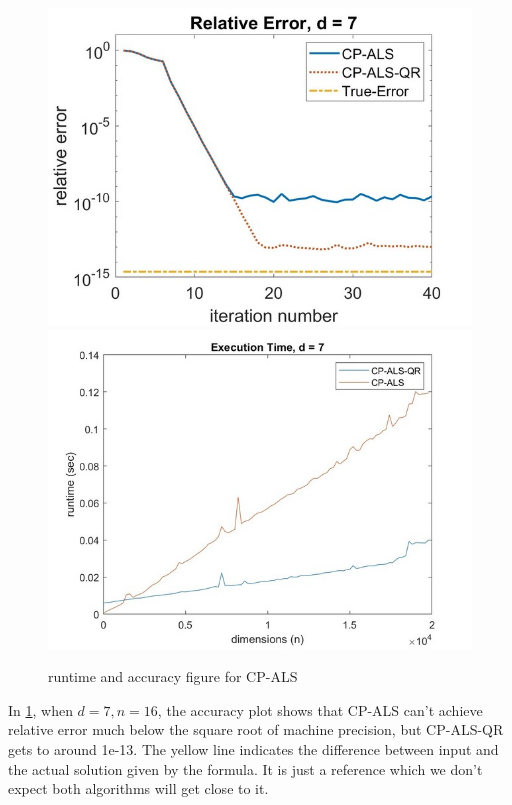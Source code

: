 \documentclass{article}
\begin{document}
\begin{figure}[ht!]
  \begin{center}
    
    \includegraphics*[scale = 0.3]{accuracy.jpeg}
    \includegraphics*[scale = 0.3]{runtime.jpeg} 
    
    \caption[Figure]{runtime and accuracy figure for CP-ALS \label{fig:error}}
  \end{center}
  
\end{figure}

In \cref{fig:error}, when $d = 7, n=16$, the accuracy plot shows that CP-ALS can't achieve relative error much below the square root of machine precision, but CP-ALS-QR gets to around 1e-13. 
The yellow line indicates the difference between input and the actual solution given by the formula. 
It is just a reference which we don't expect both algorithms will get close to it.
\end{document}
